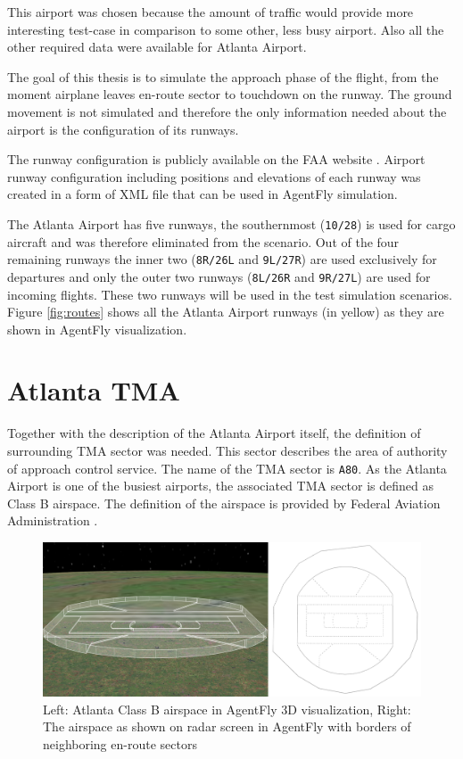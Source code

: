 This airport was chosen because the amount of traffic would provide more interesting test-case in comparison to some other, less busy airport. Also all the other required data were available for Atlanta Airport.

The goal of this thesis is to simulate the approach phase of the flight, from the moment airplane leaves en-route sector to touchdown on the runway. The ground movement is not simulated and therefore the only information needed about the airport is the configuration of its runways.

The runway configuration is publicly available on the FAA website \cite{atlanta-diagram}. Airport runway configuration including positions and elevations of each runway was created in a form of XML file that can be used in AgentFly simulation.

The Atlanta Airport has five runways, the southernmost (\texttt{10/28}) is used for cargo aircraft and was therefore eliminated from the scenario. Out of the four remaining runways the inner two (\texttt{8R/26L} and \texttt{9L/27R}) are used exclusively for departures and only the outer two runways (\texttt{8L/26R} and \texttt{9R/27L}) are used for incoming flights. These two runways will be used in the test simulation scenarios. Figure \ref{fig:routes} shows all the Atlanta Airport runways (in yellow) as they are shown in AgentFly visualization.

\section{Atlanta TMA}

Together with the description of the Atlanta Airport itself, the definition of surrounding TMA sector was needed. This sector describes the area of authority of approach control service. The name of the TMA sector is \texttt{A80}. As the Atlanta Airport is one of the busiest airports, the associated TMA sector is defined as Class B airspace. The definition of the airspace is provided by Federal Aviation Administration \cite{atlanta-tma}.

\begin{figure}[H]
    \centering
    \includegraphics[width=\textwidth]{figures/tracon.png}
    \caption{Left: Atlanta Class B airspace in AgentFly 3D visualization, Right: The airspace as shown on radar screen in AgentFly with borders of neighboring en-route sectors}
    \label{fig:tracon}
\end{figure}

